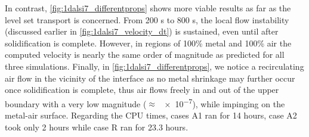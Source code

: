 In contrast, \cref{fig:1dalsi7_differentprops} shows more viable results as far as the level set transport is concerned.
From 200 s to 800 s, the local flow instability (discussed earlier in \cref{fig:1dalsi7_velocity_dt}) is sustained, even until after solidification is complete.
However, in regions of 100\% metal and 100\% air the computed velocity is nearly the same order of magnitude as predicted for all three simulations.
Finally, in \cref{fig:1dalsi7_differentprops}, we notice a recirculating air flow in the vicinity of the interface as no metal shrinkage 
may further occur once solidification is complete, thus air flows freely in and out 
of the upper boundary with a very low magnitude ($\approx$ \SI{e-7}{\uvelocity}), while impinging on the metal-air surface.
Regarding the CPU times, cases A1 ran for 14 hours, case A2 took only 2 hours while case R ran for 23.3 hours.

